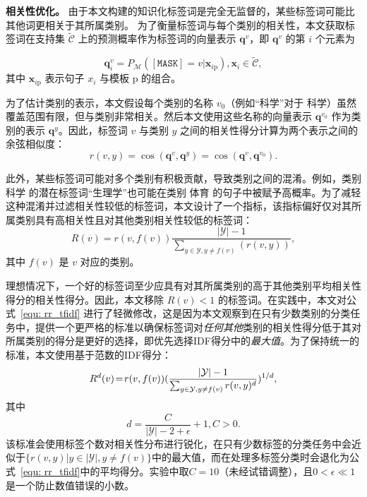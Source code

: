\textbf{相关性优化。}
由于本文构建的知识化标签词是完全无监督的，某些标签词可能比其他词更相关于其所属类别。
为了衡量标签词与每个类别的相关性，本文获取标签词在支持集 $\tilde{\mathcal{C}}$ 上的预测概率作为标签词的向量表示 $\mathbf{q}^{v}$，即 $\mathbf{q}^{v}$ 的第 $i$ 个元素为

\begin{equation}
    \mathbf{q}^{v}_i = P_{\mathcal{M}}([\texttt{MASK}]=v|\mathbf{x}_{i{\text{p}}}), \mathbf{x}_i\in \tilde{\mathcal{C}},
\end{equation}
其中 $\mathbf{x}_{i{\text{p}}}$ 表示句子 $x_i$ 与模板 $\text{p}$ 的组合。

为了估计类别的表示，本文假设每个类别的名称 $v_0$（例如“科学”对于 \textsc{科学}）虽然覆盖范围有限，但与类别非常相关。然后本文使用这些名称的向量表示 $\mathbf{q}^{v_0}$ 作为类别的表示 $\mathbf{q}^{y}$。因此，标签词 $v$ 与类别 $y$ 之间的相关性得分计算为两个表示之间的余弦相似度：
\begin{equation}
    r(v, y) = \operatorname{cos}(\mathbf{q}^{v}, \mathbf{q}^{y}) = \operatorname{cos}(\mathbf{q}^{v}, \mathbf{q}^{v_0}).
\end{equation}

此外，某些标签词可能对多个类别有积极贡献，导致类别之间的混淆。例如，类别 \textsc{科学} 的潜在标签词“生理学”也可能在类别 \textsc{体育} 的句子中被赋予高概率。为了减轻这种混淆并过滤相关性较低的标签词，本文设计了一个指标，该指标偏好仅对其所属类别具有高相关性且对其他类别相关性较低的标签词：
\begin{equation}
    R(v) = r(v, f(v)) \frac{|\mathcal{Y}|-1}{\sum_{y\in \mathcal{Y}, y\neq f(v)}(r(v,y))},
\label{equ: rr_tfidf}
\end{equation}
其中 $f(v)$ 是 $v$ 对应的类别。

理想情况下，一个好的标签词至少应具有对其所属类别的高于其他类别平均相关性得分的相关性得分。因此，本文移除 $R(v)<1$ 的标签词。在实践中，本文对公式~\eqref{equ: rr_tfidf} 进行了轻微修改，这是因为本文观察到在只有少数类别的分类任务中，提供一个更严格的标准以确保标签词对\emph{任何其他}类别的相关性得分低于其对所属类别的得分是更好的选择，即优先选择IDF得分中的\emph{最大值}。为了保持统一的标准，本文使用基于范数的IDF得分：
\begin{equation}
    R^d(v)\! =\! r(v, f(v)) \large(\frac{|\mathcal{Y}|-1}{\sum_{y\in \mathcal{Y}, y\neq f(v)} r(v,y)^d}\large)^{1/d},
\end{equation}
其中
\begin{equation}
    d = \frac{C}{|\mathcal{Y}|-2+\epsilon} +1, C>0.
\end{equation}
该标准会使用标签个数对相关性分布进行锐化，在只有少数标签的分类任务中会近似于$\{r(v,y)|y\in |\mathcal{Y}|, y\neq f(v)\}$中的最大值，而在处理多标签分类时会退化为公式~\eqref{equ: rr_tfidf}中的平均得分。实验中取$C=10$（未经试错调整），且$0 < \epsilon\ll 1$是一个防止数值错误的小数。


